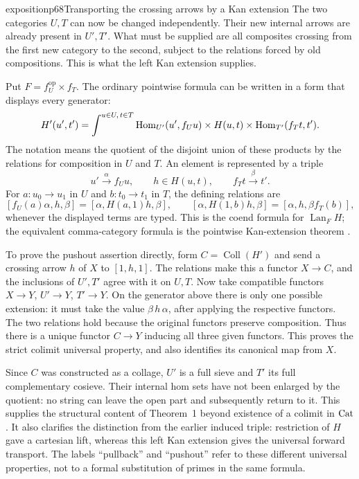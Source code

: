 \begin{dcomment}{exposition}{p68}{Transporting the crossing arrows by a Kan extension}
The two categories $U,T$ can now be changed independently. Their new internal arrows are already present in $U',T'$. What must be supplied are all composites crossing from the first new category to the second, subject to the relations forced by old compositions. This is what the left Kan extension supplies.

Put $F=f_U^{\mathrm{op}}\times f_T$. The ordinary pointwise formula can be written in a form that displays every generator:
\[
 H'(u',t')=
 \int^{u\in U,\,t\in T}
 \mathrm{Hom}_{U'}(u',f_Uu)\times H(u,t)
                  \times\mathrm{Hom}_{T'}(f_Tt,t').
\]
The notation means the quotient of the disjoint union of these products by the relations for composition in $U$ and $T$. An element is represented by a triple
\[
 u'\xrightarrow{\alpha}f_Uu,\qquad
 h\in H(u,t),\qquad f_Tt\xrightarrow{\beta}t'.
\]
For $a:u_0\to u_1$ in $U$ and $b:t_0\to t_1$ in $T$, the defining relations are
\[
 [f_U(a)\alpha,h,\beta]=[\alpha,H(a,1)h,\beta],
 \qquad
 [\alpha,H(1,b)h,\beta]=[\alpha,h,\beta f_T(b)],
\]
whenever the displayed terms are typed. This is the coend formula for $\operatorname{Lan}_F H$; the equivalent comma-category formula is the pointwise Kan-extension theorem \citep[Theorem~6.2.1]{Riehl2016}.

To prove the pushout assertion directly, form $C=\operatorname{Coll}(H')$ and send a crossing arrow $h$ of $X$ to $[1,h,1]$. The relations make this a functor $X\to C$, and the inclusions of $U',T'$ agree with it on $U,T$. Now take compatible functors $X\to Y$, $U'\to Y$, $T'\to Y$. On the generator above there is only one possible extension: it must take the value $\beta\,h\,\alpha$, after applying the respective functors. The two relations hold because the original functors preserve composition. Thus there is a unique functor $C\to Y$ inducing all three given functors. This proves the strict colimit universal property, and also identifies its canonical map from $X$.

Since $C$ was constructed as a collage, $U'$ is a full sieve and $T'$ its full complementary cosieve. Their internal hom sets have not been enlarged by the quotient: no string can leave the open part and subsequently return to it. This supplies the structural content of Theorem~1 beyond existence of a colimit in $\mathrm{Cat}$. It also clarifies the distinction from the earlier induced triple: restriction of $H$ gave a cartesian lift, whereas this left Kan extension gives the universal forward transport. The labels ``pullback'' and ``pushout'' refer to these different universal properties, not to a formal substitution of primes in the same formula.
\end{dcomment}


